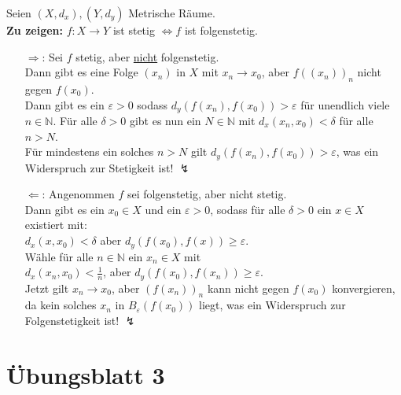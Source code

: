 \begin{problem*}[2]
  Seien \( (X,d_x), (Y,d_y) \) Metrische Räume. \\
  \textbf{Zu zeigen:} \( f: X \to Y \) ist stetig \( \Leftrightarrow f \) ist folgenstetig.
  \begin{itemize}
    \item[\( \Rightarrow \):] Sei \( f \) stetig, aber \underline{nicht} folgenstetig. \\
    Dann gibt es eine Folge \( (x_n) \) in \( X \) mit \( x_n \to x_0 \), aber \( {f((x_n))}_n \) nicht gegen \( f(x_0) \). \\
    Dann gibt es ein \( \varepsilon > 0 \) sodass \( d_y(f(x_n),f(x_0)) > \varepsilon \) für unendlich viele \( n \in \mathbb{N} \). Für alle \( \delta > 0 \) gibt es nun ein \( N \in \mathbb{N} \) mit \( d_x(x_n,x_0) < \delta \) für alle \( n > N \). \\
    Für mindestens ein solches \( n > N \) gilt \( d_y(f(x_n),f(x_0)) > \varepsilon \), was ein Widerspruch zur Stetigkeit ist! \( \lightning \)
    
    \item[\( \Leftarrow \):] Angenommen \( f \) sei folgenstetig, aber nicht stetig. \\
    Dann gibt es ein \( x_0 \in X \) und ein \( \varepsilon > 0 \), sodass für alle \( \delta > 0 \) ein \( x \in X \) existiert mit: \\
    \( d_x(x,x_0) < \delta \) aber \( d_y(f(x_0),f(x)) \geq \varepsilon \). \\
    Wähle für alle \( n \in \mathbb{N} \) ein \( x_n \in X \) mit\\
    \( d_x(x_n,x_0) < \frac{1}{n} \), aber \( d_y(f(x_0), f(x_n)) \geq \varepsilon \). \\
    Jetzt gilt \( x_n \to x_0 \), aber \( {(f(x_n))}_n \) kann nicht gegen \( f(x_0) \) konvergieren, da kein solches \( x_n \) in \( B_{\varepsilon}(f(x_0)) \) liegt, was ein Widerspruch zur Folgenstetigkeit ist! \( \lightning \)
  \end{itemize}
\end{problem*}



% 
\section{Übungsblatt 3}

